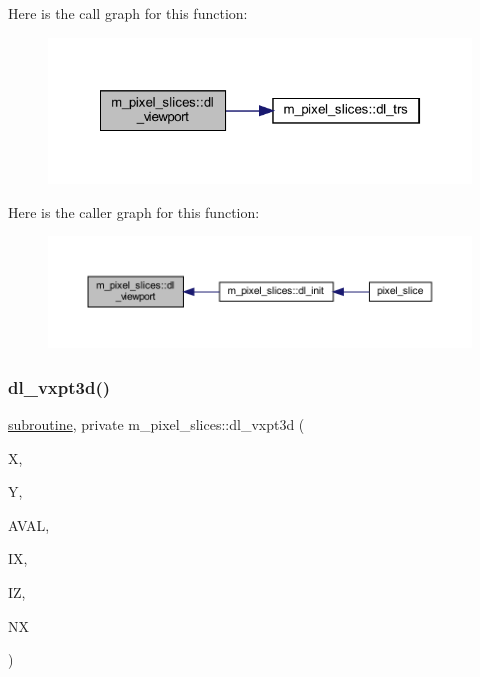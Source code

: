 Here is the call graph for this function\+:
\nopagebreak
\begin{figure}[H]
\begin{center}
\leavevmode
\includegraphics[width=322pt]{namespacem__pixel__slices_a87a664883c6c5e0e2812df4d1ea29515_cgraph}
\end{center}
\end{figure}
Here is the caller graph for this function\+:
\nopagebreak
\begin{figure}[H]
\begin{center}
\leavevmode
\includegraphics[width=350pt]{namespacem__pixel__slices_a87a664883c6c5e0e2812df4d1ea29515_icgraph}
\end{center}
\end{figure}
\mbox{\label{namespacem__pixel__slices_a61f419d67b700758eceed72e406a37f0}} 
\subsubsection{\texorpdfstring{dl\+\_\+vxpt3d()}{dl\_vxpt3d()}}
{\footnotesize\ttfamily \hyperlink{M__stopwatch_83_8txt_acfbcff50169d691ff02d4a123ed70482}{subroutine}, private m\+\_\+pixel\+\_\+slices\+::dl\+\_\+vxpt3d (\begin{DoxyParamCaption}\item[{}]{X,  }\item[{}]{Y,  }\item[{}]{A\+V\+AL,  }\item[{}]{IX,  }\item[{}]{IZ,  }\item[{}]{NX }\end{DoxyParamCaption})\hspace{0.3cm}{\ttfamily [private]}}




